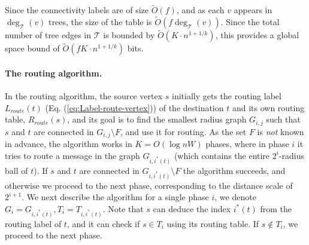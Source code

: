 Since the connectivity labels are of size $\widetilde{O}(f)$, and as each $v$ appears in $\deg_{\mathcal{T}}(v)$ trees, the size of the table is $\widetilde{O}(f \deg_{\mathcal{T}}(v)).$ Since the total number of tree edges in $\mathcal{T}$ is bounded by $\widetilde{O}(K \cdot n^{1+1/k})$, this provides a global space bound of $\widetilde{O}(fK \cdot n^{1+1/k})$ bits.


\paragraph{The routing algorithm.} In the routing algorithm, the source vertex $s$ initially gets the routing label $L_{route}(t)$ (Eq. (\ref{eq:Label-route-vertex})) of the destination $t$ and its own routing table, $R_{route}(s)$, and its goal is to find the smallest radius graph $G_{i,j}$ such that $s$ and $t$ are connected in $G_{i,j} \setminus F$, and use it for routing. 
As the set $F$ is \emph{not} known in advance, the algorithm works in $K= O(\log{nW})$ phases, where in phase $i$ it tries to route a message in the graph $G_{i,i^*(t)}$ (which contains the entire $2^i$-radius ball of $t$). If $s$ and $t$ are connected in $G_{i,i^*(t)} \setminus F$ the algorithm succeeds, and otherwise we proceed to the next phase, corresponding to the distance scale of $2^{i+1}$. 
We next describe the algorithm for a single phase $i$, we denote $G_i = G_{i,i^*(t)}, T_i = T_{i,i^*(t)}$. Note that $s$ can deduce the index $i^*(t)$ from the routing label of $t$, and it can check if $s \in T_i$ using its routing table. If $s \not \in T_i$, we proceed to the next phase.

